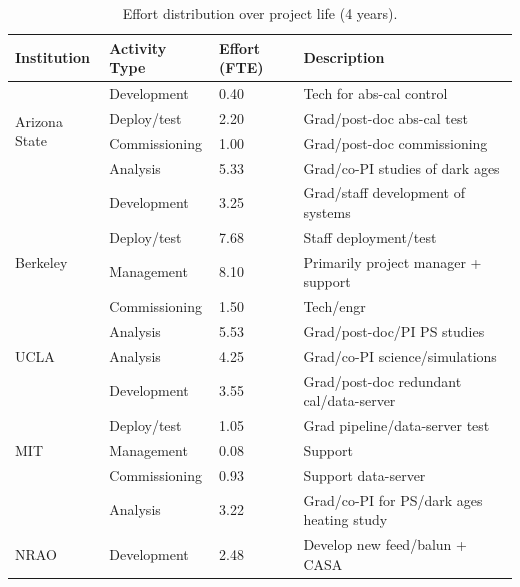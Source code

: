\documentclass[preprint]{aastex}
\begin{document}
\begin{table}[th]
\caption{Effort distribution over project life (4 years).}
\label{tab:fte}
\begin{tabular}{| p{1in} | p{1in} | p{0.5in} | p{3in} |} \hline
\textbf{Institution}  &  \textbf{Activity Type}  &  \textbf{Effort (FTE)} & \textbf{Description} \\ \hline
\multirow{4}{*}{Arizona State} & Development    & 0.40 & Tech for abs-cal control \\ 
                                                & Deploy/test       & 2.20 & Grad/post-doc abs-cal test\\
                                                & Commissioning & 1.00  & Grad/post-doc commissioning \\
                                                & Analysis      & 5.33   & Grad/co-PI studies of dark ages \\  \hline
\multirow{5}{*}{Berkeley}         & Development    & 3.25  & Grad/staff development of systems \\ 
                                                & Deploy/test      & 7.68  & Staff deployment/test \\ 
                                                & Management  & 8.10  & Primarily project manager + support \\
                                                & Commissioning  & 1.50 & Tech/engr  \\
                                                &  Analysis     & 5.53   & Grad/post-doc/PI PS studies \\  \hline
\multirow{1}{*}{UCLA}             & Analysis   & 4.25  & Grad/co-PI science/simulations  \\  \hline
\multirow{5}{*}{MIT}                 & Development & 3.55 & Grad/post-doc redundant cal/data-server \\
                                                & Deploy/test   & 1.05 & Grad pipeline/data-server test \\
                                                & Management  & 0.08 & Support \\
                                                & Commissioning  & 0.93  & Support data-server\\
                                                & Analysis         & 3.22 & Grad/co-PI for PS/dark ages heating study \\  \hline
\multirow{5}{*}{NRAO}            & Development & 2.48 & Develop new feed/balun + CASA \\ 

\end{tabular}
\end{table}
\end{document}

